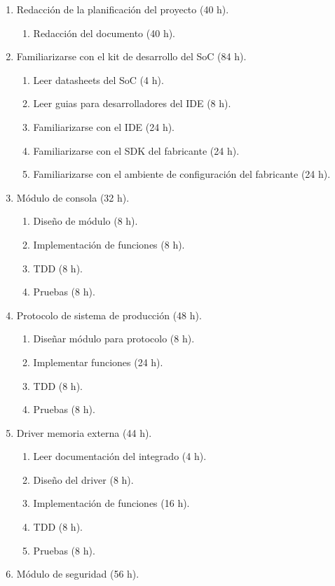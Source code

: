 \documentclass[
11pt, %
]{charter}
\begin{document}
\begin{enumerate}
\item Redacción de la planificación del proyecto (40 h).
	\begin{enumerate}
	\item Redacción del documento (40 h).	
	\end{enumerate} 
\item Familiarizarse con el kit de desarrollo del SoC (84 h).
	\begin{enumerate}
	\item Leer datasheets del SoC (4 h).
	\item Leer guias para desarrolladores del IDE (8 h).
	\item Familiarizarse con el IDE (24 h).
	\item Familiarizarse con el SDK del fabricante (24 h).
	\item Familiarizarse con el ambiente de configuración del fabricante (24 h).
	\end{enumerate}
\item Módulo de consola (32 h).
	\begin{enumerate}
	\item Diseño de módulo (8 h).
	\item Implementación de funciones (8 h).
	\item TDD (8 h).
	\item Pruebas (8 h).
	\end{enumerate}
\item Protocolo de sistema de producción (48 h).
	\begin{enumerate}
	\item Diseñar módulo para protocolo (8 h).
	\item Implementar funciones (24 h).
	\item TDD (8 h).
	\item Pruebas (8 h).
	\end{enumerate}
\item Driver memoria externa (44 h).
	\begin{enumerate}
	\item Leer documentación del integrado (4 h).
	\item Diseño del driver	(8 h).
	\item Implementación de funciones (16 h).
	\item TDD (8 h).
	\item Pruebas (8 h).
	\end{enumerate}
\item Módulo de seguridad (56 h).

\end{enumerate}
\end{document}
